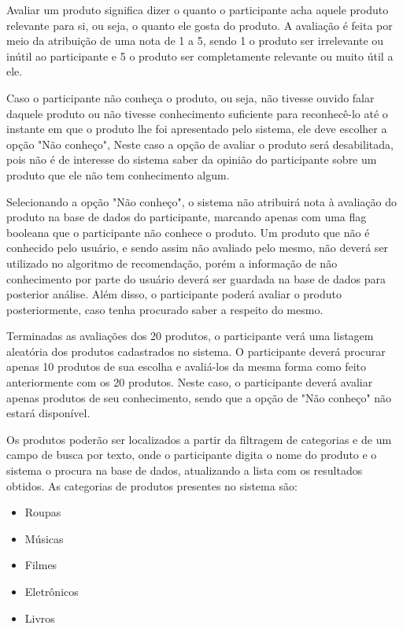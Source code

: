  Avaliar um produto significa dizer o quanto o participante acha aquele produto relevante para si, ou seja, o quanto ele gosta do produto. A avaliação é feita por meio da atribuição de uma nota de 1 a 5, sendo 1 o produto ser irrelevante ou inútil ao participante e 5 o produto ser completamente relevante ou muito útil a ele. 

 Caso o participante não conheça o produto, ou seja, não tivesse ouvido falar daquele produto ou não tivesse conhecimento suficiente para reconhecê-lo até o instante em que o produto lhe foi apresentado pelo sistema, ele deve escolher a opção "Não conheço", Neste caso a opção de avaliar o produto será desabilitada, pois não é de interesse do sistema saber da opinião do participante sobre um produto que ele não tem conhecimento algum.

 Selecionando a opção "Não conheço", o sistema não atribuirá nota à avaliação do produto na base de dados do participante, marcando apenas com uma flag booleana que o participante não conhece o produto. Um produto que não é conhecido pelo usuário, e sendo assim não avaliado pelo mesmo, não deverá ser utilizado no algoritmo de recomendação, porém a informação de não conhecimento por parte do usuário deverá ser guardada na base de dados para posterior análise. Além disso, o participante poderá avaliar o produto posteriormente, caso tenha procurado saber a respeito do mesmo.

 Terminadas as avaliações dos 20 produtos, o participante verá uma listagem aleatória dos produtos cadastrados no sistema. O participante deverá procurar apenas 10 produtos de sua escolha e avaliá-los da mesma forma como feito anteriormente com os 20 produtos. Neste caso, o participante deverá avaliar apenas produtos de seu conhecimento, sendo que a opção de "Não conheço" não estará disponível.

 Os produtos poderão ser localizados a partir da filtragem de categorias e de um campo de busca por texto, onde o participante digita o nome do produto e o sistema o procura na base de dados, atualizando a lista com os resultados obtidos. As categorias de produtos presentes no sistema são:

\begin{itemize}
	\item Roupas
	\item Músicas
	\item Filmes
	\item Eletrônicos
	\item Livros
\end{itemize}


